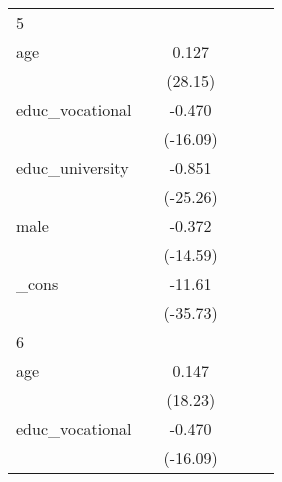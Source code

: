 {\begin{tabular}{l*{5}{c}}
\hline
5           &                     &                     &                     &                     &                     \\
age         &                     &       0.127\sym{***}&                     &                     &                     \\
            &                     &     (28.15)         &                     &                     &                     \\
[1em]
educ\_vocational&                     &      -0.470\sym{***}&                     &                     &                     \\
            &                     &    (-16.09)         &                     &                     &                     \\
[1em]
educ\_university&                     &      -0.851\sym{***}&                     &                     &                     \\
            &                     &    (-25.26)         &                     &                     &                     \\
[1em]
male        &                     &      -0.372\sym{***}&                     &                     &                     \\
            &                     &    (-14.59)         &                     &                     &                     \\
[1em]
\_cons      &                     &      -11.61\sym{***}&                     &                     &                     \\
            &                     &    (-35.73)         &                     &                     &                     \\
\hline
6           &                     &                     &                     &                     &                     \\
age         &                     &       0.147\sym{***}&                     &                     &                     \\
            &                     &     (18.23)         &                     &                     &                     \\
[1em]
educ\_vocational&                     &      -0.470\sym{***}&                     &                     &                     \\
            &                     &    (-16.09)         &                     &                     &                     \\

\end{tabular}}
